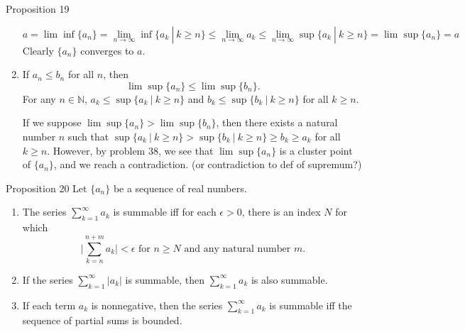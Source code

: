 \begin{flushleft}
\begin{namedthm*}{Proposition 19}
\begin{enumerate}[label=(\roman*),align=left]
	\[a= \lim \inf \{a_n \} = \lim_{n \to \infty} \inf \{ a_k\ |\ k \ge n\} \le \lim_{n \to \infty} a_k \le \lim_{n \to \infty} \sup \{ a_k\ |\ k \ge n\}= \lim \sup \{a_n \} = a\]
	Clearly $\{ a_n\}$ converges to $a$.
	\item If $a_n \le b_n$ for all $n$, then
	\[
		\lim \sup \{a_n \} \le \lim \sup \{b_n \}.	
	\]
	For any $n \in \mathbb{N}$, $a_k \le \sup \{ a_k\ |\ k \ge n\}$ and $b_k \le \sup \{ b_k\ |\ k \ge n\} $ for all $k \ge n$.\par
	If we suppose $\lim \sup \{a_n \} > \lim \sup \{b_n \}$, then there exists a natural number $n$ such that $\sup \{ a_k\ |\ k \ge n\} > \sup \{ b_k\ |\ k \ge n\} \ge b_k \ge a_k$ for all $k \ge n$.
	However, by problem 38, we see that $\lim \sup \{a_n \}$ is a cluster point of $\{a_n \}$, and we reach a contradiction. (or contradiction to def of supremum?)
\end{enumerate}	
\end{namedthm*}

\begin{namedthm*}{Proposition 20}
	Let $\{a_n \}$ be a sequence of real numbers.
	\begin{enumerate}[label=(\roman*),align=left]
		\item The series $\textstyle \sum_{k=1}^\infty a_k$ is summable iff for each $\epsilon >0$, there is an index $N$ for which
		\[
			\biggl | \sum_{k=n}^{n+m} a_k \biggr | < \epsilon \text{ for } n \ge N \text{ and any natural number } m.	
		\]
		\item If the series $\sum_{k=1}^\infty |a_k|$ is summable, then $\sum_{k=1}^\infty a_k$ is also summable.
		\item If each term $a_k$ is nonnegative, then the series $\sum_{k=1}^\infty a_k$ is summable iff the sequence of partial sums is bounded.
	\end{enumerate}	
\end{namedthm*}


\end{flushleft}


